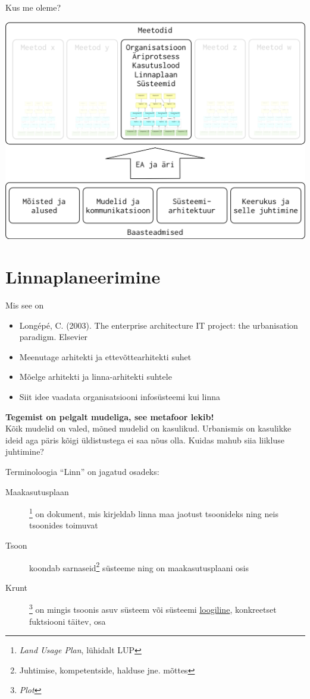 \documentclass{beamer}
\begin{document}
\begin{frame}{Kus me oleme?}
	\begin{center}
		\includegraphics[width=.8\textwidth]{aine_struktuur}
	\end{center}
\end{frame}

\section{Linnaplaneerimine}
\begin{frame}{Mis see on}
	\begin{itemize}
		\item Longépé, C. (2003). The enterprise architecture IT project: the urbanisation paradigm. Elsevier
		\item Meenutage arhitekti ja ettevõttearhitekti suhet
		\item Mõelge arhitekti ja linna-arhitekti suhtele
		\item Siit idee vaadata organisatsiooni infosüsteemi kui linna
	\end{itemize}
\end{frame}

\begin{frame}[fragile]
	\begin{center}
		\LARGE{\textbf{Tegemist on pelgalt mudeliga, see metafoor lekib!}}
		\\[4cm]
		\small{Kõik mudelid on valed, mõned mudelid on kasulikud. Urbanismis on kasulikke ideid aga päris kõigi üldistustega ei saa nõus olla. Kuidas mahub siia liikluse juhtimine?}
	\end{center}
\end{frame}

\begin{frame}{Terminoloogia}
	\enquote{Linn} on jagatud osadeks:
	\begin{description}
		\item[Maakasutusplaan]\footnote{\emph{Land Usage Plan}, lühidalt LUP} on dokument, mis kirjeldab linna maa jaotust tsoonideks ning neis tsoonides toimuvat
		\item[Tsoon] koondab sarnaseid\footnote{Juhtimise, kompetentside, halduse jne. mõttes} süsteeme ning on maakasutusplaani osis
		\item[Krunt]\footnote{\emph{Plot}} on mingis tsoonis asuv süsteem või süsteemi \underline{loogiline}, konkreetset fuktsiooni täitev, osa
	\end{description}
\end{frame}
\end{document}
